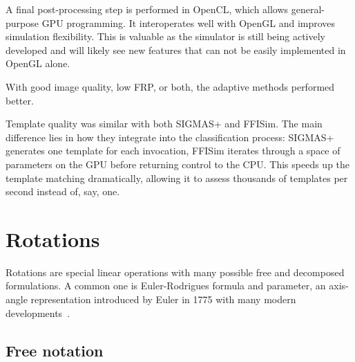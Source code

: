 A final post-processing step is performed in OpenCL, which allows general-purpose GPU programming. It interoperates well with OpenGL and improves simulation flexibility. This is valuable as the simulator is still being actively developed and will likely see new features that can not be easily implemented in OpenGL alone.

With good image quality, low FRP, or both, the adaptive methods performed better.


Template quality was similar with both SIGMAS+ and FFISim. The main difference lies in how they integrate into the classification process: SIGMAS+ generates one template for each invocation, FFISim iterates through a space of parameters on the GPU before returning control to the CPU. This speeds up the template matching dramatically, allowing it to assess thousands of templates per second instead of, say, one. 
 
%

\ifPhdDoc
\clearpage
\appendix
\renewcommand\thesection{\Roman{section}}
\else
\appendices
\fi

\section{Rotations}\label{IV_sec_transformation_matrices}

Rotations are special linear operations with many possible free and decomposed formulations. A common one is Euler-Rodrigues formula and parameter, an axis-angle representation introduced by Euler in 1775 with many modern developments~\cite{Dai2015}. %


\subsection{Free notation}\label{IV_sec:euler_rodrigues_free}

